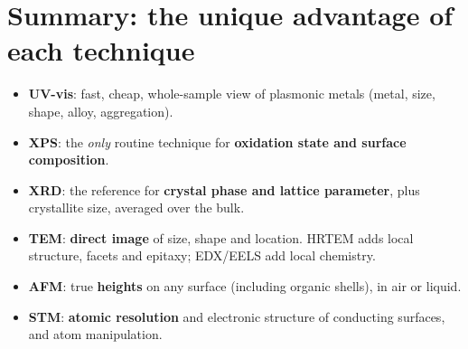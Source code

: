 \section{Summary: the unique advantage of each technique}
\begin{itemize}
  \item \textbf{UV-vis}: fast, cheap, whole-sample view of plasmonic metals (metal, size, shape, alloy, aggregation).
  \item \textbf{XPS}: the \emph{only} routine technique for \textbf{oxidation state and surface composition}.
  \item \textbf{XRD}: the reference for \textbf{crystal phase and lattice parameter}, plus crystallite size, averaged over the bulk.
  \item \textbf{TEM}: \textbf{direct image} of size, shape and location. HRTEM adds local structure, facets and epitaxy;
        EDX/EELS add local chemistry.
  \item \textbf{AFM}: true \textbf{heights} on any surface (including organic shells), in air or liquid.
  \item \textbf{STM}: \textbf{atomic resolution} and electronic structure of conducting surfaces, and atom manipulation.
\end{itemize}
